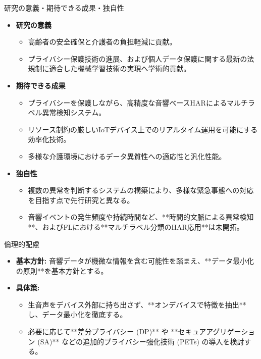 \documentclass[unicode,12pt,aspectratio=169, dvipdfmx]{beamer}
\begin{document}
\begin{frame}{研究の意義・期待できる成果・独自性}
\begin{itemize}
    \item \textbf{研究の意義}
    \begin{itemize}
        \item 高齢者の安全確保と介護者の負担軽減に貢献。
        \item プライバシー保護技術の進展、および個人データ保護に関する最新の法規制に適合した機械学習技術の実現へ学術的貢献。
    \end{itemize}
    \item \textbf{期待できる成果}
    \begin{itemize}
        \item プライバシーを保護しながら、高精度な音響ベースHARによるマルチラベル異常検知システム。
        \item リソース制約の厳しいIoTデバイス上でのリアルタイム運用を可能にする効率化技術。
        \item 多様な介護環境におけるデータ異質性への適応性と汎化性能。
    \end{itemize}
    \item \textbf{独自性}
    \begin{itemize}
        \item 複数の異常を判断するシステムの構築により、多様な緊急事態への対応を目指す点で先行研究と異なる。
        \item 音響イベントの発生頻度や持続時間など、**時間的文脈による異常検知**、およびFLにおける**マルチラベル分類のHAR応用**は未開拓。
    \end{itemize}
\end{itemize}
\end{frame}

\begin{frame}{倫理的配慮}
\begin{itemize}
    \item \textbf{基本方針:} 音響データが機微な情報を含む可能性を踏まえ、**データ最小化の原則**を基本方針とする。
    \item \textbf{具体策:}
    \begin{itemize}
        \item 生音声をデバイス外部に持ち出さず、**オンデバイスで特徴を抽出**し、データ最小化を徹底する。
        \item 必要に応じて**差分プライバシー (DP)** や **セキュアアグリゲーション (SA)** などの追加的プライバシー強化技術 (PETs) の導入を検討する。
    \end{itemize}
\end{itemize}
\end{frame}
\end{document}
